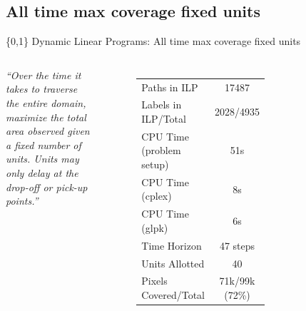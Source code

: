 \documentclass[xcolor=pdflatex,dvipsnames,table]{beamer}
\begin{document}
\subsection{All time max coverage fixed units}
\begin{frame}{\{0,1\} Dynamic Linear Programs: All time max coverage fixed units}
\begin{columns}

  \emph{``Over the time it takes to traverse the entire domain, maximize the total area observed given a fixed number of units. Units may only delay at the drop-off or pick-up points.''}
  \begin{figure}
    \begin{tabular}{|l|c|}
    \hline 
    Paths in ILP & 17487 \\
    Labels in ILP/Total & 2028/4935 \\
    CPU Time (problem setup) & 51s \\
    CPU Time (cplex) & 8s \\
    CPU Time (glpk) & 6s \\
    Time Horizon & 47 steps\\
    Units Allotted & 40\\
    Pixels Covered/Total & 71k/99k (72\%)\\
    \hline
    \end{tabular}
  \end{figure}


  \begin{figure}
    \centering
    \hfill
  \end{figure}
\end{columns}
\end{frame}

\end{document}
